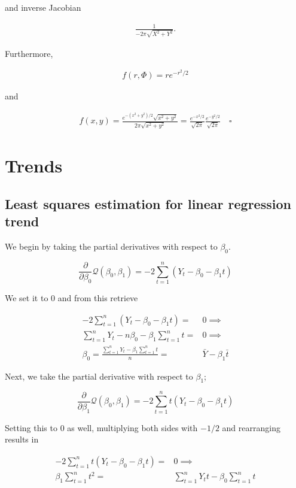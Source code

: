 \documentclass[]{book}
\theoremstyle{definition}
\theoremstyle{definition}
\theoremstyle{remark}
\begin{document}
and inverse Jacobian

\begin{gather*}
  \frac{1}{-2\pi \sqrt{X^2 + Y^2}}.
\end{gather*}

Furthermore,

\begin{gather*}
  f(r,\Phi) = re^{-r^2/2}
\end{gather*}

and

\begin{gather*} 
  f(x,y) = \frac{e^{-(x^2+y^2)/2}\sqrt{x^2 + y^2}}{2\pi \sqrt{x^2 + y^2}} = \frac{e^{-x^2/2}}{\sqrt{2\pi}}\frac{e^{-y^2/2}}{\sqrt{2\pi}} \quad \square
\end{gather*}

\chapter{Trends}\label{trends}

\section{Least squares estimation for linear regression
trend}\label{least-squares-estimation-for-linear-regression-trend}

We begin by taking the partial derivatives with respect to \(\beta_0\).

\[
\frac{\partial}{\partial{\beta_0}} \mathcal{Q}(\beta_0, \beta_1) =
  -2\sum_{t=1}^n (Y_t - \beta_0 - \beta_1 t)
\]

We set it to \(0\) and from this retrieve

\begin{align*}
-2\sum_{t=1}^n (Y_t - \beta_0 - \beta_1 t) = & 0 \implies \\
\sum_{t=1}^n Y_t - n\beta_0 - \beta_1 \sum_{t=1}^n t = & 0 \implies \\
\beta_0 = \frac{\sum_{t=1}^n Y_t - \beta_1 \sum_{t=1}^n t}{n} = &
  \bar{Y} - \beta_1 \bar{t}
\end{align*}

Next, we take the partial derivative with respect to \(\beta_1\);

\[
\frac{\partial}{\partial{\beta_1}} \mathcal{Q}(\beta_0, \beta_1) =
  -2\sum_{t=1}^n t(Y_t - \beta_0 - \beta_1 t)
\]

Setting this to \(0\) as well, multiplying both sides with \(-1/2\) and
rearranging results in

\begin{align*}
-2\sum_{t=1}^n t (Y_t - \beta_0 - \beta_1 t) = & 0 \implies \\
\beta_1 \sum_{t=1}^n t^2 = & \sum_{t=1}^n Y_t t - \beta_0 \sum_{t=1}^n t
\end{align*}
\end{document}

